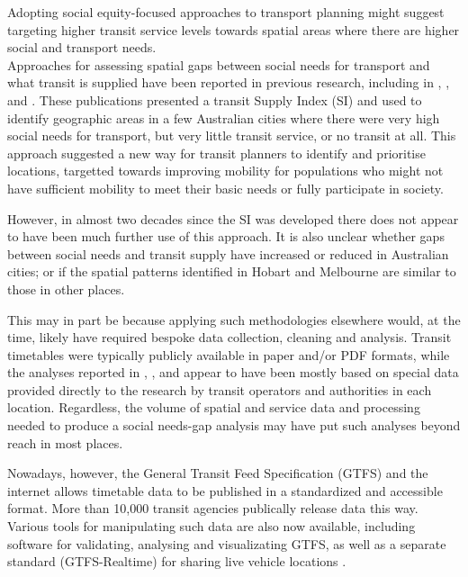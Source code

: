 \documentclass[preprint, 3p,
authoryear]{elsarticle} %
\begin{document}
Adopting social equity-focused approaches to transport planning might
suggest targeting higher transit service levels towards spatial areas
where there are higher social and transport needs.\\
Approaches for assessing spatial gaps between social needs for transport
and what transit is supplied have been reported in previous research,
including in \citet{Currie2003Hobart}, \citet{Currie2004Gap},
\citet{Currie2007Identifying} and \citet{currie2010identifying}. These
publications presented a transit Supply Index (SI) and used to identify
geographic areas in a few Australian cities where there were very high
social needs for transport, but very little transit service, or no
transit at all. This approach suggested a new way for transit planners
to identify and prioritise locations, targetted towards improving
mobility for populations who might not have sufficient mobility to meet
their basic needs or fully participate in society.

However, in almost two decades since the SI was developed there does not
appear to have been much further use of this approach. It is also
unclear whether gaps between social needs and transit supply have
increased or reduced in Australian cities; or if the spatial patterns
identified in Hobart \citep{Currie2003Hobart, Currie2004Gap} and
Melbourne \citep{Currie2007Identifying, currie2010identifying} are
similar to those in other places.

This may in part be because applying such methodologies elsewhere would,
at the time, likely have required bespoke data collection, cleaning and
analysis. Transit timetables were typically publicly available in paper
and/or PDF formats, while the analyses reported in
\citet{Currie2003Hobart}, \citet{Currie2004Gap},
\citet{Currie2007Identifying} and \citet{currie2010identifying} appear
to have been mostly based on special data provided directly to the
research by transit operators and authorities in each location.
Regardless, the volume of spatial and service data and processing needed
to produce a social needs-gap analysis may have put such analyses beyond
reach in most places.

Nowadays, however, the General Transit Feed Specification (GTFS) and the
internet allows timetable data to be published in a standardized and
accessible format. More than 10,000 transit agencies publically release
data this way. Various tools for manipulating such data are also now
available, including software for validating, analysing and
visualizating GTFS, as well as a separate standard (GTFS-Realtime) for
sharing live vehicle locations \citep{GTFS}.
\end{document}
